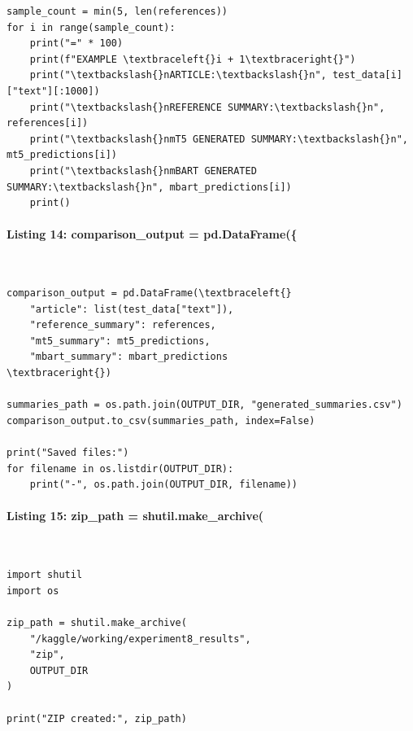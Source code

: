 \documentclass[12pt,a4paper,oneside]{report}
\begin{document}
\begin{Verbatim}[commandchars=\\\{\},breaklines=true,breakanywhere=true,fontsize=\scriptsize,frame=leftline,framesep=2mm,rulecolor=\color{gray}]
sample_count = min(5, len(references))
for i in range(sample_count):
    print("=" * 100)
    print(f"EXAMPLE \textbraceleft{}i + 1\textbraceright{}")
    print("\textbackslash{}nARTICLE:\textbackslash{}n", test_data[i]["text"][:1000])
    print("\textbackslash{}nREFERENCE SUMMARY:\textbackslash{}n", references[i])
    print("\textbackslash{}nmT5 GENERATED SUMMARY:\textbackslash{}n", mt5_predictions[i])
    print("\textbackslash{}nmBART GENERATED SUMMARY:\textbackslash{}n", mbart_predictions[i])
    print()
\end{Verbatim}
\paragraph{Listing 14: comparison\_output = pd.DataFrame(\{}\mbox{}\\[-1ex]
\begin{Verbatim}[commandchars=\\\{\},breaklines=true,breakanywhere=true,fontsize=\scriptsize,frame=leftline,framesep=2mm,rulecolor=\color{gray}]
comparison_output = pd.DataFrame(\textbraceleft{}
    "article": list(test_data["text"]),
    "reference_summary": references,
    "mt5_summary": mt5_predictions,
    "mbart_summary": mbart_predictions
\textbraceright{})

summaries_path = os.path.join(OUTPUT_DIR, "generated_summaries.csv")
comparison_output.to_csv(summaries_path, index=False)

print("Saved files:")
for filename in os.listdir(OUTPUT_DIR):
    print("-", os.path.join(OUTPUT_DIR, filename))
\end{Verbatim}
\paragraph{Listing 15: zip\_path = shutil.make\_archive(}\mbox{}\\[-1ex]
\begin{Verbatim}[commandchars=\\\{\},breaklines=true,breakanywhere=true,fontsize=\scriptsize,frame=leftline,framesep=2mm,rulecolor=\color{gray}]
import shutil
import os

zip_path = shutil.make_archive(
    "/kaggle/working/experiment8_results",
    "zip",
    OUTPUT_DIR
)

print("ZIP created:", zip_path)
\end{Verbatim}
\end{document}

